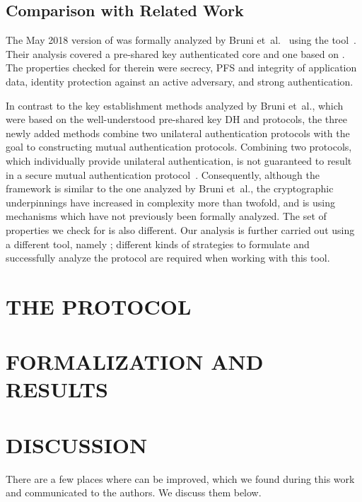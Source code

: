 \documentclass[a4paper,twoside,draft]{article}
\begin{document}
\subsection{Comparison with Related Work}
The May 2018 version of \mEdhoc{} was formally analyzed by
Bruni et~al.~\cite{DBLP:conf/secsr/BruniJPS18} using the \mProverif{}
tool~\cite{DBLP:conf/csfw/Blanchet01}.
%
Their analysis covered a pre-shared key authenticated core and one
based on \mSigma.
%
The properties checked for therein were secrecy, PFS and integrity of
application data, identity protection against an active adversary,
and strong authentication.
%

In contrast to the key establishment methods analyzed by Bruni et~al., which
were based on the well-understood pre-shared key DH and \mSigma{} protocols,
the three newly added
methods combine two unilateral authentication protocols with the goal to
constructing mutual authentication protocols.
%
Combining two protocols, which individually provide unilateral authentication,
is not guaranteed to result in a secure mutual authentication
protocol~\cite{DBLP:conf/ccs/Krawczyk16}.
%
Consequently, although the framework is similar to the one analyzed by Bruni
et~al., the cryptographic underpinnings have increased in complexity more than
twofold, and is using mechanisms which have not previously been formally analyzed.
%
The set of properties we check for is also different.
%
Our analysis is further carried out using a different tool,
namely \mTamarin; different kinds of strategies to formulate and
successfully analyze the protocol are required when working with this tool.
%

\section{\uppercase{The \mEdhoc{} Protocol}}
\label{sec:edhoc}


\section{\uppercase{Formalization and Results}}
\label{sec:formalization}


\section{\uppercase{Discussion}}
\label{sec:discussion}
There are a few places where \mEdhoc{} can be improved,
which we found during this work and communicated to the authors.
%
We discuss them below.
%
\end{document}
